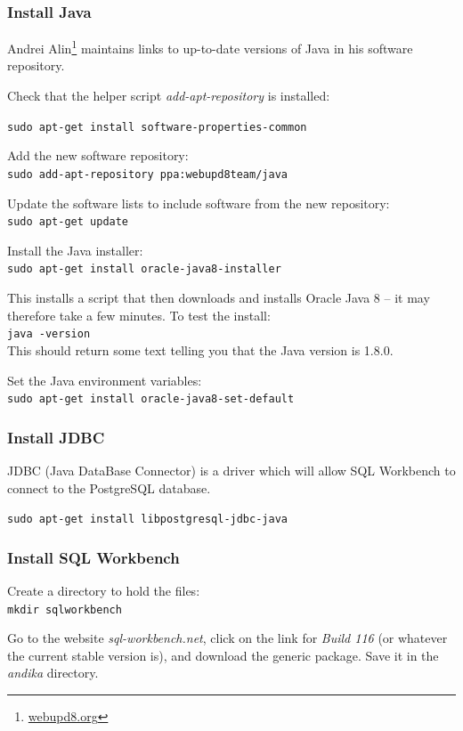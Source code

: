 \subsubsection{Install Java}

Andrei Alin\footnote{\url{webupd8.org}} maintains links to up-to-date versions of Java in his software repository.

Check that the helper script \textit{add-apt-repository} is installed:

\verb|sudo apt-get install software-properties-common|

Add the new software repository:\\
\verb|sudo add-apt-repository ppa:webupd8team/java|

Update the software lists to include software from the new repository:\\
\verb|sudo apt-get update|

Install the Java installer:\\
\verb|sudo apt-get install oracle-java8-installer|

This installs a script that then downloads and installs Oracle Java 8 -- it may therefore take a few minutes.  To test the install:\\
\verb|java -version|\\
This should return some text telling you that the Java version is 1.8.0.

Set the Java environment variables:\\
\verb|sudo apt-get install oracle-java8-set-default|

\subsubsection{Install JDBC}
\label{ss:jdbc}

JDBC (Java DataBase Connector) is a driver which will allow SQL Workbench to connect to the PostgreSQL database.

\verb|sudo apt-get install libpostgresql-jdbc-java|

\subsubsection{Install SQL Workbench}

Create a directory to hold the files:\\
\verb|mkdir sqlworkbench|

Go to the website \textit{sql-workbench.net}, click on the link for \textit{Build 116} (or whatever the current stable version is), and download the generic package.  Save it in the \textit{andika} directory.

